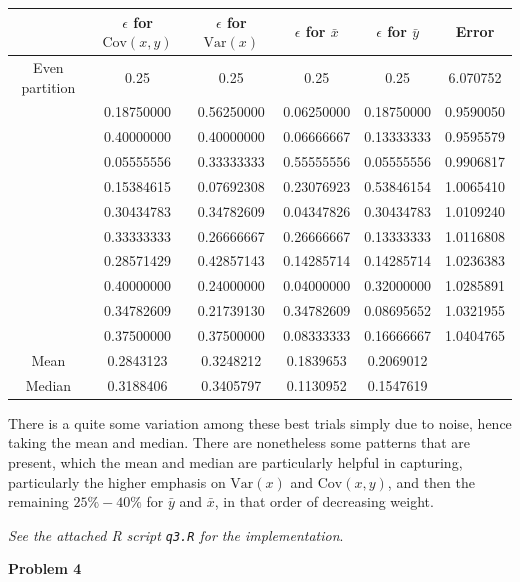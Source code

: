 \documentclass[12pt]{article}
\begin{document}
\begin{center}
\begin{tabular}{|c||c|c|c|c||c|}\hline
	& $\epsilon$ for $\text{Cov}(x, y)$ & $\epsilon$ for $\text{Var}(x)$ &  $\epsilon$ for $\bar{x}$ & $\epsilon$ for $\bar{y}$ & Error\\\hline\hline
	Even partition & 0.25 & 0.25 & 0.25 & 0.25 & 6.070752 \\\hline\hline
	&0.18750000 & 0.56250000&0.06250000&0.18750000& 0.9590050 \\
	 & 0.40000000 & 0.40000000 & 0.06666667 & 0.13333333 & 0.9595579 \\
	 & 0.05555556 & 0.33333333 & 0.55555556 & 0.05555556 & 0.9906817 \\
	 & 0.15384615 & 0.07692308 & 0.23076923 & 0.53846154 & 1.0065410 \\
	 & 0.30434783 & 0.34782609 & 0.04347826 & 0.30434783 & 1.0109240 \\
	 & 0.33333333 & 0.26666667 & 0.26666667 & 0.13333333 & 1.0116808 \\
	 & 0.28571429 & 0.42857143 & 0.14285714 & 0.14285714 & 1.0236383 \\
	 & 0.40000000 & 0.24000000 & 0.04000000 & 0.32000000 & 1.0285891 \\
	 & 0.34782609 & 0.21739130 & 0.34782609 & 0.08695652 & 1.0321955 \\
	 & 0.37500000 & 0.37500000 & 0.08333333 & 0.16666667 & 1.0404765 \\\hline\hline
	 Mean&0.2843123 & 0.3248212 & 0.1839653 & 0.2069012 & \\
	 Median & 0.3188406 & 0.3405797 & 0.1130952 & 0.1547619 & \\\hline
\end{tabular}
\end{center}
There is a quite some variation among these best trials simply due to noise, hence taking the mean and median. There are nonetheless some patterns that are present, which the mean and median are particularly helpful in capturing, particularly the higher emphasis on $\text{Var}(x)$ and $\text{Cov}(x, y)$, and then the remaining $25\%-40\%$ for $\bar{y}$ and $\bar{x}$, in that order of decreasing weight.


\emph{See the attached R script \texttt{q3.R} for the implementation}.\\

\pagebreak

{\large\textbf{Problem 4}}
\end{document}
